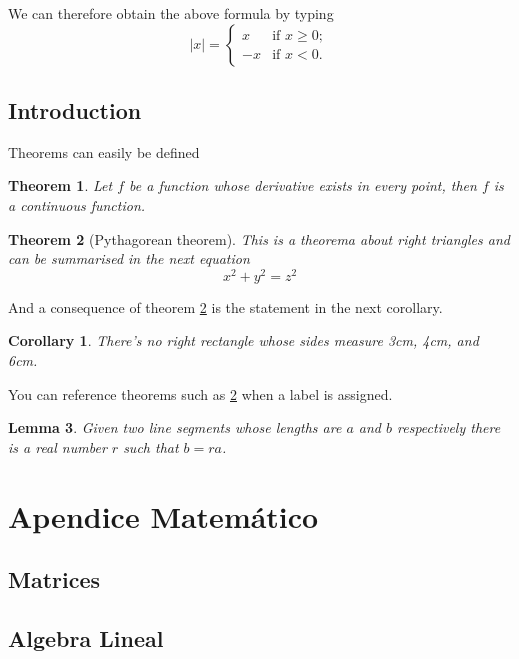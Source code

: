             
        We can therefore obtain the above formula by typing
        \[ |x| = \left\{ \begin{array}{ll}
                 x & \mbox{if $x \geq 0$};\\
                -x & \mbox{if $x < 0$}.\end{array} \right. \]


\newtheorem{theorem}{Theorem}[section]
\newtheorem{corollary}{Corollary}[theorem]
\newtheorem{lemma}[theorem]{Lemma}
 

\section{Introduction}
Theorems can easily be defined
 
\begin{theorem}
Let $f$ be a function whose derivative exists in every point, then $f$ is 
a continuous function.
\end{theorem}
 
\begin{theorem}[Pythagorean theorem]
\label{pythagorean}
This is a theorema about right triangles and can be summarised in the next 
equation 
\[ x^2 + y^2 = z^2 \]
\end{theorem}
 
And a consequence of theorem \ref{pythagorean} is the statement in the next 
corollary.
 
\begin{corollary}
There's no right rectangle whose sides measure 3cm, 4cm, and 6cm.
\end{corollary}
 
You can reference theorems such as \ref{pythagorean} when a label is assigned.
 
\begin{lemma}
Given two line segments whose lengths are $a$ and $b$ respectively there is a 
real number $r$ such that $b=ra$.
\end{lemma}


\chapter{Apendice Matemático}
    \section{Matrices}
    \section{Algebra Lineal}
